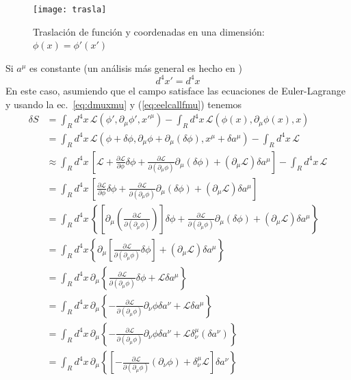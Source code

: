 \begin{figure} %
  \centering %
  \texttt{[image: trasla]} %
  \caption{Traslación de función y coordenadas en una dimensión: $\phi(x)=\phi'(x')$ } %
  \label{fig:trasla} %
\end{figure} %
Si $a^\mu$ es constante (un análisis más general es hecho en \cite{r})
\begin{equation}
  d^4x'=d^4x
\end{equation}
En este caso, asumiendo que el campo satisface las ecuaciones de
Euler-Lagrange y usando la ec.~\eqref{eq:dmuxmu} y (\ref{eq:eelcallfmu}) tenemos
\begin{align}
  \delta S&=\int_{R}d^4x\,\mathcal{L}(\phi',\partial_\mu\phi',{x'}^\mu)-\int_{R}d^4x\,\mathcal{L}(\phi(x),\partial_\mu\phi(x),x)\nonumber\\
  &=\int_{R}d^4x\,\mathcal{L}(\phi+\delta\phi,\partial_\mu\phi+\partial_\mu(\delta\phi),x^\mu+\delta a^\mu)-\int_{R}d^4x\,\mathcal{L}\nonumber\\
  &\approx\int_{R}d^4x\,
  \left[\mathcal{L}+
    \frac{\partial\mathcal{L}}{\partial\phi}\delta\phi+\frac{\partial\mathcal{L}}{\partial(\partial_\mu\phi)}\partial_\mu(\delta\phi)+
    (\partial_\mu\mathcal{L})\delta a^\mu\right]-\int_{R}d^4x\,\mathcal{L}\nonumber\\
  &=\int_{R}d^4x\,
  \left[
    \frac{\partial\mathcal{L}}{\partial\phi}\delta\phi+\frac{\partial\mathcal{L}}{\partial(\partial_\mu\phi)}\partial_\mu(\delta\phi)+
    (\partial_\mu\mathcal{L})\delta a^\mu\right]\nonumber\\
  &=\int_{R}d^4x\,
  \left\{ 
    \left[\partial_\mu\left(\frac{\partial\mathcal{L}}{\partial(\partial_\mu\phi)}
    \right)\right]\delta\phi+\frac{\partial\mathcal{L}}{\partial(\partial_\mu\phi)}\partial_\mu(\delta\phi)+
    (\partial_\mu\mathcal{L})\delta a^\mu\right\}\nonumber\\
  &=\int_{R}d^4x\left\{ 
    \partial_\mu\left[\frac{\partial\mathcal{L}}{\partial(\partial_\mu\phi)}\delta\phi\right]
  +(\partial_\mu\mathcal{L})\delta a^\mu\right\}\nonumber\\
   &=\int_{R}d^4x\,\partial_\mu\left\{ 
    \frac{\partial\mathcal{L}}{\partial(\partial_\mu\phi)}\delta\phi
  +\mathcal{L}\delta a^\mu\right\}\nonumber\\
   &=\int_{R}d^4x\,\partial_\mu\left\{ 
    -\frac{\partial\mathcal{L}}{\partial(\partial_\mu\phi)}\partial_\nu\phi\delta a^\nu
  +\mathcal{L}\delta a^\mu\right\}\nonumber\\
   &=\int_{R}d^4x\,\partial_\mu\left\{ 
    -\frac{\partial\mathcal{L}}{\partial(\partial_\mu\phi)}\partial_\nu\phi\delta a^\nu
  +\mathcal{L}\delta^\mu_\nu(\delta a^\nu)\right\}\nonumber\\
    &=\int_{R}d^4x\,
    \partial_\mu\left\{\left[
      -\frac{\partial\mathcal{L}}{\partial(\partial_\mu\phi)}(\partial_\nu\phi)
      +\delta^\mu_\nu\mathcal{L}
    \right]\delta a^\nu\right\}\nonumber\\
    \label{eq:2qft}
\end{align}

